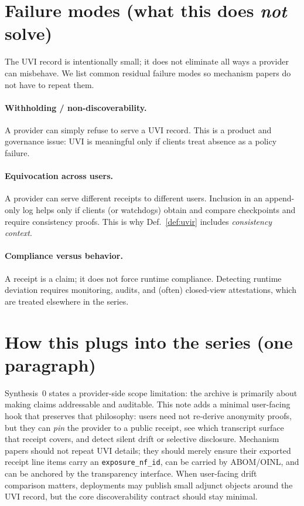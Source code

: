 \documentclass[11pt]{article}
\begin{document}
\section{Failure modes (what this does \emph{not} solve)}
The UVI record is intentionally small; it does not eliminate all ways a provider can misbehave.
We list common residual failure modes so mechanism papers do not have to repeat them.

\paragraph{Withholding / non-discoverability.}
A provider can simply refuse to serve a UVI record.
This is a product and governance issue: UVI is meaningful only if clients treat absence as a policy failure.

\paragraph{Equivocation across users.}
A provider can serve different receipts to different users.
Inclusion in an append-only log helps only if clients (or watchdogs) obtain and compare checkpoints and require consistency proofs.
This is why Def.~\ref{def:uvir} includes \emph{consistency context}.

\paragraph{Compliance versus behavior.}
A receipt is a claim; it does not force runtime compliance.
Detecting runtime deviation requires monitoring, audits, and (often) closed-view attestations, which are treated elsewhere in the series.\cite{series:state3}

\section{How this plugs into the series (one paragraph)}
Synthesis~0 states a provider-side scope limitation: the archive is primarily about making claims addressable and auditable.\cite{series:contractobjects}
This note adds a minimal user-facing hook that preserves that philosophy:
users need not re-derive anonymity proofs, but they can \emph{pin} the provider to a public receipt, see which transcript surface that receipt covers, and detect silent drift or selective disclosure.
Mechanism papers should not repeat UVI details; they should merely ensure their exported receipt line items carry an \texttt{exposure\_nf\_id}, can be carried by ABOM/OINL, and can be anchored by the transparency interface.
When user-facing drift comparison matters, deployments may publish small adjunct objects around the UVI record, but the core discoverability contract should stay minimal.
\end{document}
